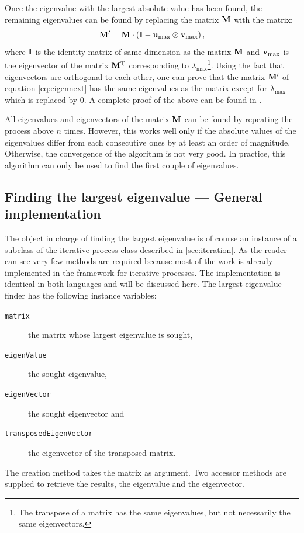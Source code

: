\documentclass[twoside]{book}
\begin{document}
Once the eigenvalue with the largest absolute value has been
found, the remaining eigenvalues can be found by replacing the
matrix ${\bf M}$ with the matrix:
\begin{equation}
\label{eq:eigennext}
  {\bf M}^{\prime}={\bf M}\cdot\left({\bf I}-{\bf u}_{\max}\otimes{\bf
  v}_{\max}\right),
\end{equation}
where ${\bf I}$ is the identity matrix of same dimension as the
matrix ${\bf M}$ and ${\bf v}_{\max}$ is the eigenvector of the
matrix ${\bf M}^{\mathop{\rm T}}$ corresponding to
$\lambda_{\max}$\footnote{The transpose of a matrix has the same
eigenvalues, but not necessarily the same eigenvectors.}. Using
the fact that eigenvectors are orthogonal to each other, one can
prove that the matrix ${\bf M}^{\prime}$ of equation
\ref{eq:eigennext} has the same eigenvalues as the matrix except
for $\lambda_{\max}$ which is replaced by 0. A complete proof of
the above can be found in \cite{Bass}.

All eigenvalues and eigenvectors of the matrix ${\bf M}$ can be
found by repeating the process above $n$ times. However, this
works well only if the absolute values of the eigenvalues differ
from each consecutive ones by at least an order of magnitude.
Otherwise, the convergence of the algorithm is not very good. In
practice, this algorithm can only be used to find the first couple
of eigenvalues.

\subsection{Finding the largest eigenvalue --- General
implementation} The object in
charge of finding the largest eigenvalue is of course an instance
of a subclass of the iterative process class described in
\ref{sec:iteration}. As the reader can see very few methods are
required because most of the work is already implemented in the
framework for iterative processes. The implementation is identical
in both languages and will be discussed here. The largest
eigenvalue finder has the following instance variables:
\begin{description}
  \item[\tt matrix] the matrix whose largest eigenvalue is sought,
  \item[\tt eigenValue] the sought eigenvalue,
  \item[\tt eigenVector] the sought eigenvector and
  \item[\tt transposedEigenVector] the eigenvector of the
  transposed matrix.
\end{description}
The creation method takes the matrix as argument. Two accessor
methods are supplied to retrieve the results, the eigenvalue and
the eigenvector.
\end{document}
